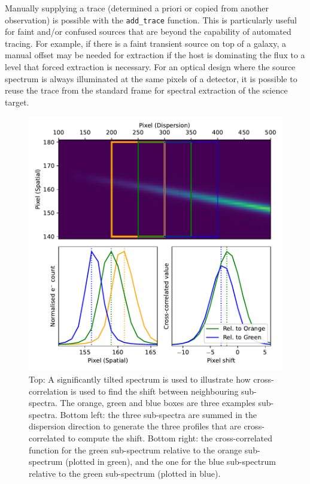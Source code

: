 \documentclass[linenumbers, twocolumn]{aastex631}
\begin{document}
Manually supplying a trace (determined a priori or copied from another observation) is possible with the \texttt{add\_trace}
function. This is particularly useful for faint and/or confused
sources that are beyond the capability of automated tracing. For
example, if there is a faint transient source on top of a galaxy,
a manual offset may be needed for extraction if the host is
dominating the flux to a level that forced extraction is necessary.
For an optical design where the source spectrum is always illuminated
at the same pixels of a detector, it is possible to reuse the trace
from the standard frame for spectral extraction of the science target.

\begin{figure}
    \centering
    \includegraphics[width=\columnwidth]{fig_01_tracing.pdf}
    \caption{Top: A significantly tilted spectrum is used to illustrate how
    cross-correlation is used to find the shift between neighbouring
    sub-spectra. The orange, green and blue boxes are three examples
    sub-spectra. Bottom left: the three sub-spectra are summed in
    the dispersion direction to generate the three profiles that are
    cross-correlated to compute the shift. Bottom right: the
    cross-correlated function for the green sub-spectrum relative
    to the orange sub-spectrum (plotted in green), and the one
    for the blue sub-spectrum relative to the green sub-spectrum
    (plotted in blue).}
    \label{fig:trace}
\end{figure}
\end{document}
